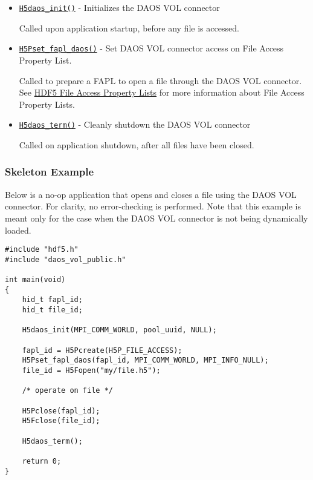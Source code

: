 \begin{itemize}
    \item \texttt{\hyperref[ref:h5daos_init]{H5daos\_init()}} - Initializes the DAOS VOL connector

    Called upon application startup, before any file is accessed.
    
    \item \texttt{\hyperref[ref:h5pset_fapl_daos]{H5Pset\_fapl\_daos()}} - Set DAOS VOL connector access on File Access Property List.

    Called to prepare a FAPL to open a file through the DAOS VOL connector. See \href{https://support.hdfgroup.org/HDF5/Tutor/property.html#fa}{HDF5 File Access Property Lists} for more information about File Access Property Lists.

    \item \texttt{\hyperref[ref:h5daos_term]{H5daos\_term()}} - Cleanly shutdown the DAOS VOL connector

    Called on application shutdown, after all files have been closed.
\end{itemize}

\newpage

\subsubsection{Skeleton Example}

Below is a no-op application that opens and closes a file using the DAOS VOL connector. For clarity, no error-checking is performed. Note that this example is meant only for the case when the DAOS VOL connector is not being dynamically loaded.

\begin{verbatim}
#include "hdf5.h"
#include "daos_vol_public.h"

int main(void)
{
    hid_t fapl_id;
    hid_t file_id;

    H5daos_init(MPI_COMM_WORLD, pool_uuid, NULL);

    fapl_id = H5Pcreate(H5P_FILE_ACCESS);
    H5Pset_fapl_daos(fapl_id, MPI_COMM_WORLD, MPI_INFO_NULL);
    file_id = H5Fopen("my/file.h5");

    /* operate on file */

    H5Pclose(fapl_id);
    H5Fclose(file_id);

    H5daos_term();

    return 0;
}
\end{verbatim}

\newpage

